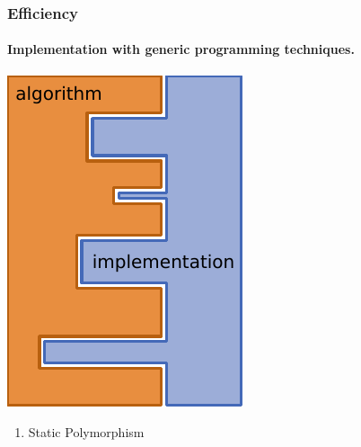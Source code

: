\documentclass[aspectratio=169,11pt]{beamer}
\theoremstyle{definition}
\begin{document}
\begin{frame}
  \frametitle{Efficiency}

  \framesubtitle<presentation>{Implementation with generic programming
    techniques.}


  \begin{minipage}{0.32\textwidth}
    \begin{center}
      \includegraphics[width={\textwidth}]{generic}
    \end{center}
  \end{minipage}
  \begin{minipage}{0.65\textwidth-1ex}
      \begin{enumerate}
      \item Static Polymorphism
        \begin{itemize}

\end{itemize}
\end{enumerate}
\end{minipage}
\end{frame}
\end{document}
